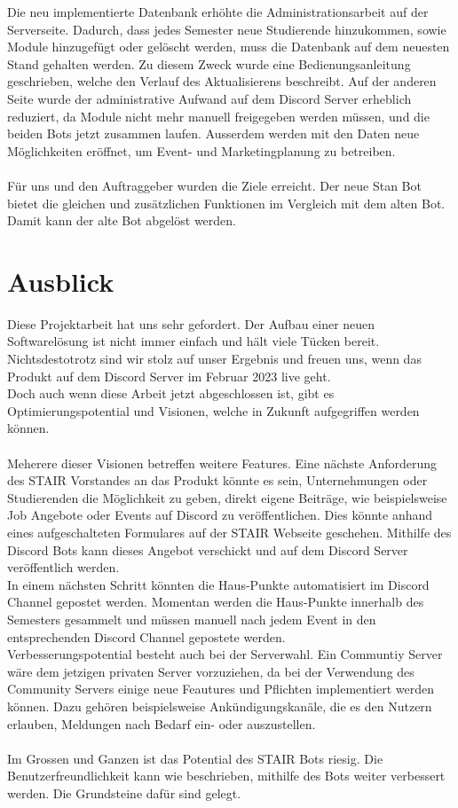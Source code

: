 \documentclass[a4paper, table]{article}
\begin{document}
Die neu implementierte Datenbank erhöhte die Administrationsarbeit auf der Serverseite. 
Dadurch, dass jedes Semester neue Studierende hinzukommen, sowie Module hinzugefügt oder gelöscht werden, muss die Datenbank auf dem neuesten Stand gehalten werden. 
Zu diesem Zweck wurde eine Bedienungsanleitung geschrieben, welche den Verlauf des Aktualisierens beschreibt. 
Auf der anderen Seite wurde der administrative Aufwand auf dem Discord Server erheblich reduziert, da Module nicht mehr manuell freigegeben werden müssen, und die beiden Bots jetzt zusammen laufen. 
Ausserdem werden mit den Daten neue Möglichkeiten eröffnet, um Event- und Marketingplanung zu betreiben.\\\\
Für uns und den Auftraggeber wurden die Ziele erreicht. 
Der neue Stan Bot bietet die gleichen und zusätzlichen Funktionen im Vergleich mit dem alten Bot. 
Damit kann der alte Bot abgelöst werden.

\newpage
\section{Ausblick}

Diese Projektarbeit hat uns sehr gefordert.
Der Aufbau einer neuen Softwarelösung ist nicht immer einfach und hält viele Tücken bereit.
Nichtsdestotrotz sind wir stolz auf unser Ergebnis und freuen uns, wenn das Produkt auf dem Discord Server im Februar 2023 live geht.\\
Doch auch wenn diese Arbeit jetzt abgeschlossen ist, gibt es Optimierungspotential und Visionen, welche in Zukunft aufgegriffen werden können.\\\\
Meherere dieser Visionen betreffen weitere Features.
Eine nächste Anforderung des STAIR Vorstandes an das Produkt könnte es sein, Unternehmungen oder Studierenden die Möglichkeit zu geben, direkt eigene Beiträge, wie beispielsweise Job Angebote oder Events auf Discord zu veröffentlichen.
Dies könnte anhand eines aufgeschalteten Formulares auf der STAIR Webseite geschehen.
Mithilfe des Discord Bots kann dieses Angebot verschickt und auf dem Discord Server veröffentlich werden.\\
In einem nächsten Schritt könnten die Haus-Punkte automatisiert im Discord Channel gepostet werden.
Momentan werden die Haus-Punkte innerhalb des Semesters gesammelt und müssen manuell nach jedem Event in den entsprechenden Discord Channel gepostete werden.\\
Verbesserungspotential besteht auch bei der Serverwahl.
Ein Communtiy Server wäre dem jetzigen privaten Server vorzuziehen, da bei der Verwendung des Community Servers einige neue Feautures und Pflichten implementiert werden können.
Dazu gehören beispielsweise Ankündigungskanäle, die es den Nutzern erlauben, Meldungen nach Bedarf ein- oder auszustellen.\autocite{noauthor_richte_nodate}\\\\
Im Grossen und Ganzen ist das Potential des STAIR Bots riesig.
Die Benutzerfreundlichkeit kann wie beschrieben, mithilfe des Bots weiter verbessert werden.
Die Grundsteine dafür sind gelegt.
\end{document}

